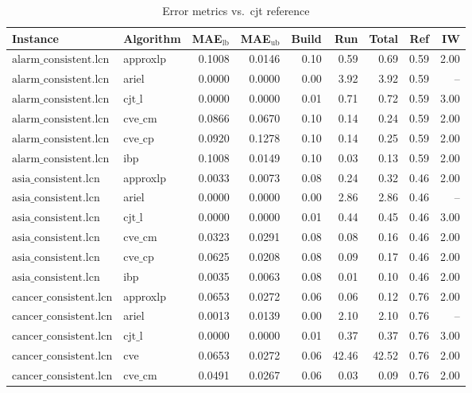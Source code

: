 \begin{table}[ht]
\centering
\scriptsize
\caption{Error metrics vs.\ cjt reference}
\begin{tabular}{llrrrrrrr}
\toprule
Instance & Algorithm & MAE$_{\text{lb}}$ & MAE$_{\text{ub}}$ & Build & Run & Total & Ref & IW \\
\midrule
$\text{alarm\_consistent.lcn}$ & approxlp & 0.1008 & 0.0146 & 0.10 & 0.59 & 0.69 & 0.59 & 2.00 \\
$\text{alarm\_consistent.lcn}$ & ariel & 0.0000 & 0.0000 & 0.00 & 3.92 & 3.92 & 0.59 & -- \\
$\text{alarm\_consistent.lcn}$ & $\text{cjt\_l}$ & 0.0000 & 0.0000 & 0.01 & 0.71 & 0.72 & 0.59 & 3.00 \\
$\text{alarm\_consistent.lcn}$ & $\text{cve\_cm}$ & 0.0866 & 0.0670 & 0.10 & 0.14 & 0.24 & 0.59 & 2.00 \\
$\text{alarm\_consistent.lcn}$ & $\text{cve\_cp}$ & 0.0920 & 0.1278 & 0.10 & 0.14 & 0.25 & 0.59 & 2.00 \\
$\text{alarm\_consistent.lcn}$ & ibp & 0.1008 & 0.0149 & 0.10 & 0.03 & 0.13 & 0.59 & 2.00 \\
$\text{asia\_consistent.lcn}$ & approxlp & 0.0033 & 0.0073 & 0.08 & 0.24 & 0.32 & 0.46 & 2.00 \\
$\text{asia\_consistent.lcn}$ & ariel & 0.0000 & 0.0000 & 0.00 & 2.86 & 2.86 & 0.46 & -- \\
$\text{asia\_consistent.lcn}$ & $\text{cjt\_l}$ & 0.0000 & 0.0000 & 0.01 & 0.44 & 0.45 & 0.46 & 3.00 \\
$\text{asia\_consistent.lcn}$ & $\text{cve\_cm}$ & 0.0323 & 0.0291 & 0.08 & 0.08 & 0.16 & 0.46 & 2.00 \\
$\text{asia\_consistent.lcn}$ & $\text{cve\_cp}$ & 0.0625 & 0.0208 & 0.08 & 0.09 & 0.17 & 0.46 & 2.00 \\
$\text{asia\_consistent.lcn}$ & ibp & 0.0035 & 0.0063 & 0.08 & 0.01 & 0.10 & 0.46 & 2.00 \\
$\text{cancer\_consistent.lcn}$ & approxlp & 0.0653 & 0.0272 & 0.06 & 0.06 & 0.12 & 0.76 & 2.00 \\
$\text{cancer\_consistent.lcn}$ & ariel & 0.0013 & 0.0139 & 0.00 & 2.10 & 2.10 & 0.76 & -- \\
$\text{cancer\_consistent.lcn}$ & $\text{cjt\_l}$ & 0.0000 & 0.0000 & 0.01 & 0.37 & 0.37 & 0.76 & 3.00 \\
$\text{cancer\_consistent.lcn}$ & cve & 0.0653 & 0.0272 & 0.06 & 42.46 & 42.52 & 0.76 & 2.00 \\
$\text{cancer\_consistent.lcn}$ & $\text{cve\_cm}$ & 0.0491 & 0.0267 & 0.06 & 0.03 & 0.09 & 0.76 & 2.00 \\

\end{tabular}
\end{table}
